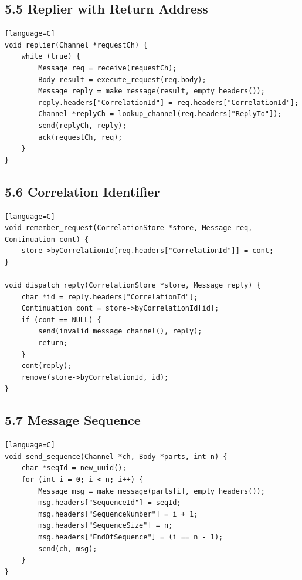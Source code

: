 \documentclass[11pt]{article}
\begin{document}
\subsection{5.5 Replier with Return
Address}\label{replier-with-return-address}

\begin{verbatim}[language=C]
void replier(Channel *requestCh) {
    while (true) {
        Message req = receive(requestCh);
        Body result = execute_request(req.body);
        Message reply = make_message(result, empty_headers());
        reply.headers["CorrelationId"] = req.headers["CorrelationId"];
        Channel *replyCh = lookup_channel(req.headers["ReplyTo"]);
        send(replyCh, reply);
        ack(requestCh, req);
    }
}
\end{verbatim}

\subsection{5.6 Correlation Identifier}\label{correlation-identifier}

\begin{verbatim}[language=C]
void remember_request(CorrelationStore *store, Message req, Continuation cont) {
    store->byCorrelationId[req.headers["CorrelationId"]] = cont;
}

void dispatch_reply(CorrelationStore *store, Message reply) {
    char *id = reply.headers["CorrelationId"];
    Continuation cont = store->byCorrelationId[id];
    if (cont == NULL) {
        send(invalid_message_channel(), reply);
        return;
    }
    cont(reply);
    remove(store->byCorrelationId, id);
}
\end{verbatim}

\subsection{5.7 Message Sequence}\label{message-sequence}

\begin{verbatim}[language=C]
void send_sequence(Channel *ch, Body *parts, int n) {
    char *seqId = new_uuid();
    for (int i = 0; i < n; i++) {
        Message msg = make_message(parts[i], empty_headers());
        msg.headers["SequenceId"] = seqId;
        msg.headers["SequenceNumber"] = i + 1;
        msg.headers["SequenceSize"] = n;
        msg.headers["EndOfSequence"] = (i == n - 1);
        send(ch, msg);
    }
}
\end{verbatim}
\end{document}
